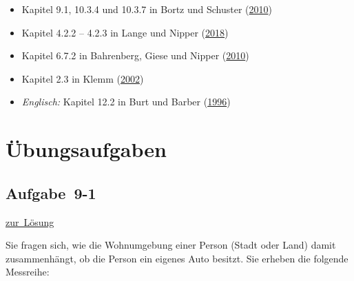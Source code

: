 \documentclass[
  11pt,
  ngerman,
  a4paper,
]{report}
\providecommand{\tightlist}{%
  \setlength{\itemsep}{0pt}\setlength{\parskip}{0pt}}
\begin{document}
\begin{itemize}
\tightlist
\item
  Kapitel 9.1, 10.3.4 und 10.3.7 in Bortz und Schuster (\protect\hyperlink{ref-bortz}{2010})
\item
  Kapitel 4.2.2 -- 4.2.3 in Lange und Nipper (\protect\hyperlink{ref-delange}{2018})
\item
  Kapitel 6.7.2 in Bahrenberg, Giese und Nipper (\protect\hyperlink{ref-bahrenberg}{2010})
\item
  Kapitel 2.3 in Klemm (\protect\hyperlink{ref-klemm}{2002})
\item
  \emph{Englisch:} Kapitel 12.2 in Burt und Barber (\protect\hyperlink{ref-burt}{1996})
\end{itemize}

\hypertarget{uxfcbungsaufgaben-8}{%
\section*{Übungsaufgaben}\label{uxfcbungsaufgaben-8}}

\hypertarget{aufgabe-9-1}{%
\subsection{Aufgabe~9-1}\label{aufgabe-9-1}}

\protect\hyperlink{loesung-9-1}{zur~Lösung}

Sie fragen sich, wie die Wohnumgebung einer Person (Stadt oder Land) damit zusammenhängt, ob die Person ein eigenes Auto besitzt. Sie erheben die folgende Messreihe:
\end{document}
